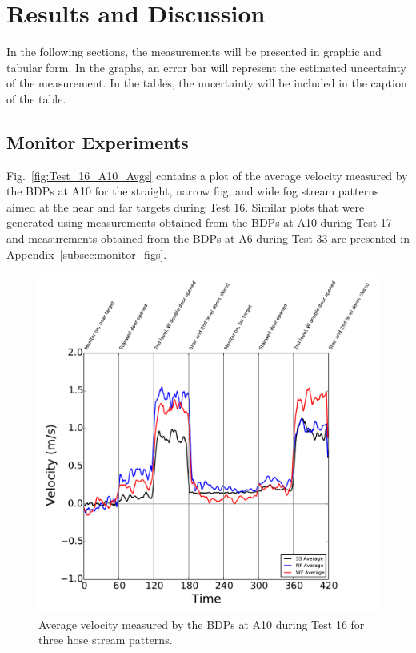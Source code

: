 \documentclass[12pt,oneside]{book}
\begin{document}

\chapter{Results and Discussion}
\label{chap:results}
In the following sections, the measurements will be presented in graphic and tabular form. In the graphs, an error bar will represent the estimated uncertainty of the measurement. In the tables, the uncertainty will be included in the caption of the table.

\section{Monitor Experiments}
\label{sec:monitor_results}

Fig.~\ref{fig:Test_16_A10_Avgs} contains a plot of the average velocity measured by the BDPs at A10 for the straight, narrow fog, and wide fog stream patterns aimed at the near and far targets during Test 16. Similar plots that were generated using measurements obtained from the BDPs at A10 during Test 17 and measurements obtained from the BDPs at A6 during Test 33 are presented in Appendix~\ref{subsec:monitor_figs}.

\begin{figure}[!ht]
\includegraphics[width=6in]{../../../Figures/Hose_Test_Figures/Test_16_West_063014_custom_BDP_A10_Avg}
\caption{Average velocity measured by the BDPs at A10 during Test 16 for three hose stream patterns.}
\label{fig:Test_16_BDP_A10_Avgs}
\end{figure}
\FloatBarrier
\end{document}

